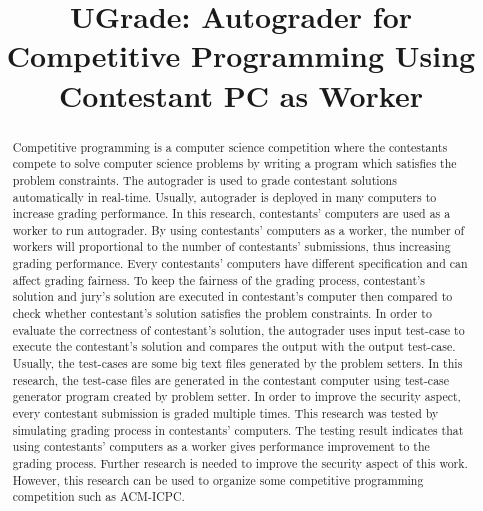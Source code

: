 \documentclass[conference,a4paper]{IEEEtran}
\begin{document}
\title{UGrade: Autograder for Competitive Programming Using Contestant PC as Worker}

\author{
    \and
}

\maketitle

\begin{abstract}
Competitive programming is a computer science competition where the contestants compete to solve computer science problems by writing a program which satisfies the problem constraints. The autograder is used to grade contestant solutions automatically in real-time. Usually, autograder is deployed in many computers to increase grading performance. In this research, contestants' computers are used as a worker to run autograder. By using contestants' computers as a worker, the number of workers will proportional to the number of contestants' submissions, thus increasing grading performance. Every contestants' computers have different specification and can affect grading fairness. To keep the fairness of the grading process, contestant's solution and jury's solution are executed in contestant's computer then compared to check whether contestant's solution satisfies the problem constraints. In order to evaluate the correctness of contestant's solution, the autograder uses input test-case to execute the contestant's solution and compares the output with the output test-case. Usually, the test-cases are some big text files generated by the problem setters. In this research, the test-case files are generated in the contestant computer using test-case generator program created by problem setter. In order to improve the security aspect, every contestant submission is graded multiple times. This research was tested by simulating grading process in contestants' computers. The testing result indicates that using contestants' computers as a worker gives performance improvement to the grading process. Further research is needed to improve the security aspect of this work. However, this research can be used to organize some competitive programming competition such as ACM-ICPC.
\end{abstract}
\end{document}
